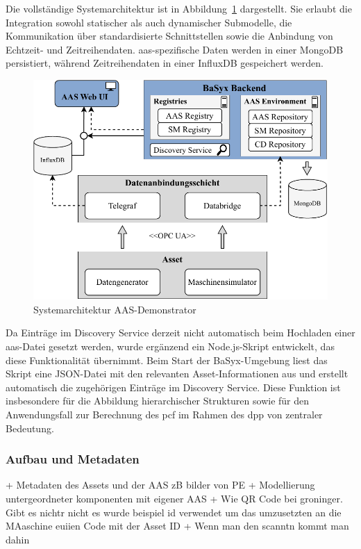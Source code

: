 Die vollständige Systemarchitektur ist in Abbildung~\ref{fig:Systemarchitektur} dargestellt.
Sie erlaubt die Integration sowohl statischer als auch dynamischer Submodelle, die Kommunikation über standardisierte Schnittstellen sowie die Anbindung von Echtzeit- und Zeitreihendaten.
\acs{aas}-spezifische Daten werden in einer MongoDB persistiert, während Zeitreihendaten in einer InfluxDB gespeichert werden.

\begin{figure}[htbp]
    \centering
        \includegraphics[width=1\textwidth]{Bilder/Ergebnisse/DynamischeDaten/Architektur.pdf}
    \caption{Systemarchitektur AAS-Demonstrator}
    \label{fig:Systemarchitektur}
\end{figure}

Da Einträge im Discovery Service derzeit nicht automatisch beim Hochladen einer \acs{aas}-Datei gesetzt werden, wurde ergänzend ein Node.js-Skript entwickelt, das diese Funktionalität übernimmt.
Beim Start der BaSyx-Umgebung liest das Skript eine JSON-Datei mit den relevanten Asset-Informationen aus und erstellt automatisch die zugehörigen Einträge im Discovery Service.
Diese Funktion ist insbesondere für die Abbildung hierarchischer Strukturen sowie für den Anwendungsfall zur Berechnung des \acs{pcf} im Rahmen des \acs{dpp} von zentraler Bedeutung.

\subsubsection{Aufbau und Metadaten}

+ Metadaten des Assets und der AAS zB bilder von PE
+ Modellierung untergeordneter komponenten mit eigener AAS
+ Wie QR Code bei groninger. Gibt es nichtr nicht es wurde beispiel id verwendet um das umzusetzten an die MAaschine euiien Code mit der Asset ID
+ Wenn man den scanntn kommt man dahin

